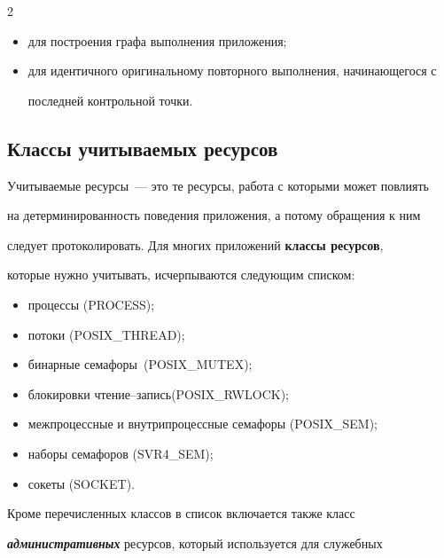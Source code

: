 \begin{multicols}{2}
\begin{itemize}

\item для построения графа выполнения приложения;

\item для идентичного оригинальному повторного выполнения, начинающегося с

последней контрольной точки.

\end{itemize}



\subsection*{Классы учитываемых ресурсов}



Учитываемые ресурсы~--- это те ресурсы, рабо\-та с которыми может повлиять

на де\-тер\-ми\-нирован\-ность поведения приложения, а потому обращения к ним

следует протоколировать. Для многих приложений \textbf{классы ресурсов},

которые нужно учитывать, исчерпываются сле\-ду\-ющим списком:

\begin{itemize}

\item процессы (PROCESS);

\item потоки (POSIX\_THREAD);

\item бинарные семафоры~(POSIX\_MUTEX);

\item блокировки чтение--запись\newline (POSIX\_RWLOCK);

\item межпроцессные и внутрипроцессные семафоры (POSIX\_SEM);

\item наборы семафоров (SVR4\_SEM);

\item сокеты (SOCKET).

\end{itemize}



Кроме перечисленных классов в список включается также класс

{\bfseries\textit{административных}} ресурсов, который используется для служебных


\end{multicols}
